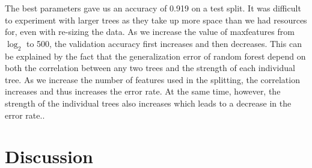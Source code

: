 \documentclass[twoside,twocolumn]{article}
\begin{document}
The best parameters gave us an accuracy of 0.919 on a test split. It was difficult to experiment with larger trees as they take up more space than we had resources for, even with re-sizing the data. As we increase the value of max\textunderscore features from $\log_2$ to 500, the validation accuracy first increases and then decreases. This can be explained by the fact that the generalization error of random forest depend on both the correlation between any two trees and the strength of each individual tree. As we increase the number of features used in the splitting, the correlation increases and thus increases the error rate. At the same time, however, the strength of the individual trees also increases which leads to a decrease in the error rate.\cite{Random Forest}.
\section{Discussion}
\end{document}
